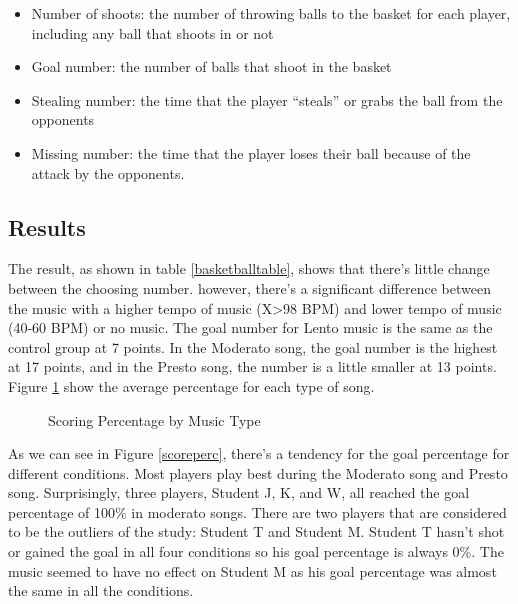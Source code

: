 \documentclass{article}
\begin{document}
\begin{itemize}
\item Number of shoots: the number of throwing balls to the basket for each player, including any ball that shoots in or not
\item Goal number: the number of balls that shoot in the basket
\item Stealing number: the time that the player ``steals'' or grabs the ball from the opponents
\item Missing number: the time that the player loses their ball because of the attack by the opponents.
\end{itemize}

\subsection{Results}

The result, as shown in table \ref{basketballtable}, shows that there's little change between the choosing number. however, there's a significant difference between the music with a higher tempo of music (X>98 BPM) and lower tempo of music (40-60 BPM) or no music. The goal number for Lento music is the same as the control group at 7 points. In the Moderato song, the goal number is the highest at 17 points, and in the Presto song, the number is a little smaller at 13 points. Figure \ref{scoring_percentage} show the average percentage for each type of song.

\begin{figure}[h]
\centering
\caption{Scoring Percentage by Music Type}
\label{scoring_percentage}
\end{figure}


As we can see in Figure \ref{scoreperc}, there's a tendency for the goal percentage for different conditions. Most players play best during the Moderato song and Presto song. Surprisingly, three players, Student J, K, and W, all reached the goal percentage of 100\% in moderato songs. There are two players that are considered to be the outliers of the study: Student T and Student M. Student T hasn't shot or gained the goal in all four conditions so his goal percentage is always 0\%. The music seemed to have no effect on Student M as his goal percentage was almost the same in all the conditions.
\end{document}
